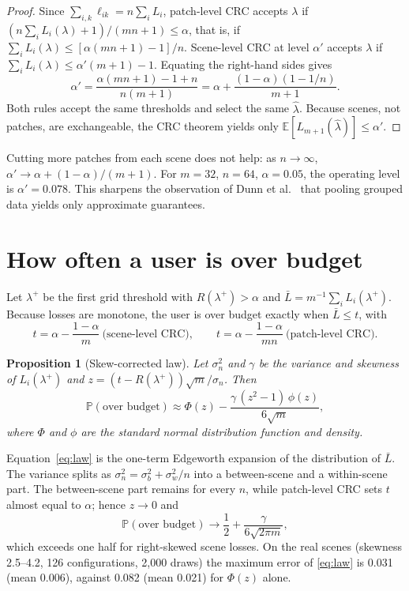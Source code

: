 \documentclass[11pt,a4paper]{article}
\newtheorem{proposition}{Proposition}
\theoremstyle{definition}
\theoremstyle{remark}
\newcommand{\E}{\mathbb{E}}
\newcommand{\Prob}{\mathbb{P}}
\newcommand{\1}{\mathbf{1}}
\begin{document}
\begin{proof}
Since $\sum_{i,k}\ell_{ik}=n\sum_iL_i$, patch-level CRC accepts $\lambda$ if $(n\sum_iL_i(\lambda)+1)/(mn+1)\le\alpha$, that is, if $\sum_iL_i(\lambda)\le[\alpha(mn+1)-1]/n$. Scene-level CRC at level $\alpha'$ accepts $\lambda$ if $\sum_iL_i(\lambda)\le\alpha'(m+1)-1$. Equating the right-hand sides gives
\[
\alpha'=\frac{\alpha(mn+1)-1+n}{n(m+1)}=\alpha+\frac{(1-\alpha)(1-1/n)}{m+1}.
\]
Both rules accept the same thresholds and select the same $\hat\lambda$. Because scenes, not patches, are exchangeable, the CRC theorem yields only $\E[L_{m+1}(\hat\lambda)]\le\alpha'$.
\end{proof}

Cutting more patches from each scene does not help: as $n\to\infty$, $\alpha'\to\alpha+(1-\alpha)/(m+1)$. For $m=32$, $n=64$, $\alpha=0.05$, the operating level is $\alpha'=0.078$. This sharpens the observation of Dunn et al.\ \cite{dunn} that pooling grouped data yields only approximate guarantees.

\section{How often a user is over budget}

Let $\lambda^{+}$ be the first grid threshold with $R(\lambda^{+})>\alpha$ and $\bar L=m^{-1}\sum_iL_i(\lambda^{+})$. Because losses are monotone, the user is over budget exactly when $\bar L\le t$, with
\begin{equation}
t=\alpha-\frac{1-\alpha}{m}\ \text{(scene-level CRC)},\qquad
t=\alpha-\frac{1-\alpha}{mn}\ \text{(patch-level CRC)}.
\end{equation}

\begin{proposition}[Skew-corrected law]\label{prop:law}
Let $\sigma_n^2$ and $\gamma$ be the variance and skewness of $L_i(\lambda^{+})$ and $z=(t-R(\lambda^{+}))\sqrt m/\sigma_n$. Then
\begin{equation}
\Prob(\text{over budget})\approx\Phi(z)-\frac{\gamma\,(z^2-1)\,\phi(z)}{6\sqrt m},
\label{eq:law}
\end{equation}
where $\Phi$ and $\phi$ are the standard normal distribution function and density.
\end{proposition}

Equation~\eqref{eq:law} is the one-term Edgeworth expansion \cite{hall} of the distribution of $\bar L$. The variance splits as $\sigma_n^2=\sigma_b^2+\sigma_w^2/n$ into a between-scene and a within-scene part. The between-scene part remains for every $n$, while patch-level CRC sets $t$ almost equal to $\alpha$; hence $z\to0$ and
\begin{equation}
\Prob(\text{over budget})\to\frac12+\frac{\gamma}{6\sqrt{2\pi m}},
\end{equation}
which exceeds one half for right-skewed scene losses. On the real scenes (skewness 2.5--4.2, 126 configurations, 2{,}000 draws) the maximum error of \eqref{eq:law} is 0.031 (mean 0.006), against 0.082 (mean 0.021) for $\Phi(z)$ alone.
\end{document}
